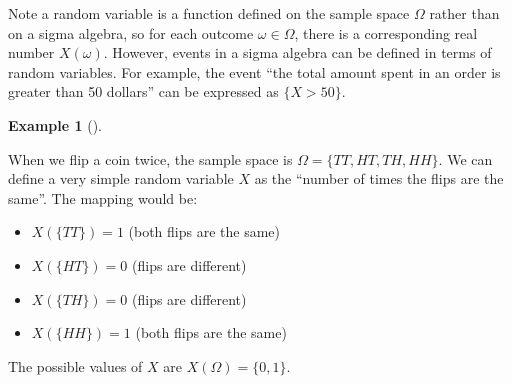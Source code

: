 \documentclass[
  letterpaper,
  DIV=11,
  numbers=noendperiod]{scrreport}
\providecommand{\tightlist}{%
  \setlength{\itemsep}{0pt}\setlength{\parskip}{0pt}}
\theoremstyle{definition}
\newtheorem{example}{Example}[chapter]
\theoremstyle{plain}
\theoremstyle{definition}
\theoremstyle{plain}
\theoremstyle{remark}
\begin{document}
Note a random variable is a function defined on the sample space
\(\Omega\) rather than on a sigma algebra, so for each outcome
\(\omega \in \Omega\), there is a corresponding real number
\(X(\omega)\). However, events in a sigma algebra can be defined in
terms of random variables. For example, the event ``the total amount
spent in an order is greater than 50 dollars'' can be expressed as
\(\{X > 50\}\).

\begin{tcolorbox}[enhanced jigsaw, breakable, opacityback=0, leftrule=.75mm, colback=white, bottomtitle=1mm, coltitle=black, toptitle=1mm, titlerule=0mm, bottomrule=.15mm, colframe=quarto-callout-note-color-frame, title={Random variable: Number of equal coin flips}, opacitybacktitle=0.6, colbacktitle=quarto-callout-note-color!10!white, rightrule=.15mm, arc=.35mm, toprule=.15mm, left=2mm]

\begin{example}[]\protect\hypertarget{exm-random-variable-equals}{}\label{exm-random-variable-equals}

When we flip a coin twice, the sample space is
\(\Omega = \{TT, HT, TH, HH\}\). We can define a very simple random
variable \(X\) as the ``number of times the flips are the same''. The
mapping would be:

\begin{itemize}
\tightlist
\item
  \(X(\{TT\}) = 1\) (both flips are the same)
\item
  \(X(\{HT\}) = 0\) (flips are different)
\item
  \(X(\{TH\}) = 0\) (flips are different)
\item
  \(X(\{HH\}) = 1\) (both flips are the same)
\end{itemize}

The possible values of \(X\) are \(X(\Omega)=\{0, 1\}\).

\end{example}

\end{tcolorbox}
\end{document}
